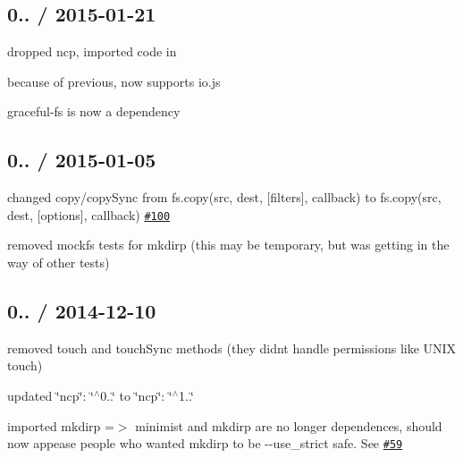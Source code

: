 \subsection*{0.. / 2015-\/01-\/21 }


\begin{DoxyItemize}
\item dropped {\ttfamily ncp}, imported code in
\item because of previous, now supports {\ttfamily io.\+js}
\item {\ttfamily graceful-\/fs} is now a dependency
\end{DoxyItemize}

\subsection*{0.. / 2015-\/01-\/05 }


\begin{DoxyItemize}
\item changed {\ttfamily copy}/{\ttfamily copy\+Sync} from {\ttfamily fs.\+copy(src, dest, \mbox{[}filters\mbox{]}, callback)} to {\ttfamily fs.\+copy(src, dest, \mbox{[}options\mbox{]}, callback)} \href{https://github.com/jprichardson/node-fs-extra/pull/100}{\tt \#100}
\item removed mockfs tests for mkdirp (this may be temporary, but was getting in the way of other tests)
\end{DoxyItemize}

\subsection*{0.. / 2014-\/12-\/10 }


\begin{DoxyItemize}
\item removed {\ttfamily touch} and {\ttfamily touch\+Sync} methods (they didn\textquotesingle{}t handle permissions like U\+N\+IX touch)
\item updated {\ttfamily \char`\"{}ncp\char`\"{}\+: \char`\"{}$^\wedge$0..\char`\"{}} to {\ttfamily \char`\"{}ncp\char`\"{}\+: \char`\"{}$^\wedge$1..\char`\"{}}
\item imported {\ttfamily mkdirp} =$>$ {\ttfamily minimist} and {\ttfamily mkdirp} are no longer dependences, should now appease people who wanted {\ttfamily mkdirp} to be {\ttfamily -\/-\/use\+\_\+strict} safe. See \href{[#59][#59]}{\tt \#59}
\end{DoxyItemize}

